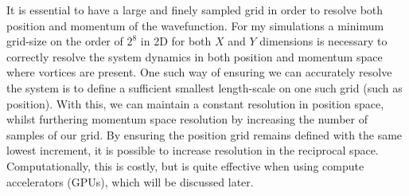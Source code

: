 It is essential to have a large and finely sampled grid in order to resolve both position and momentum of the wavefunction. For my simulations a minimum grid-size on the order of $2^8$ in 2D for both $X$ and $Y$ dimensions is necessary to correctly resolve the system dynamics in both position and momentum space where vortices are present. One such way of ensuring we can accurately resolve the system is to define a sufficient smallest length-scale on one such grid (such as position). With this, we can maintain a constant resolution in position space, whilst furthering momentum space resolution by increasing the number of samples of our grid. By ensuring the position grid remains defined with the same lowest increment, it is possible to increase resolution in the reciprocal space. Computationally, this is costly, but is quite effective when using compute accelerators (GPUs), which will be discussed later. %
